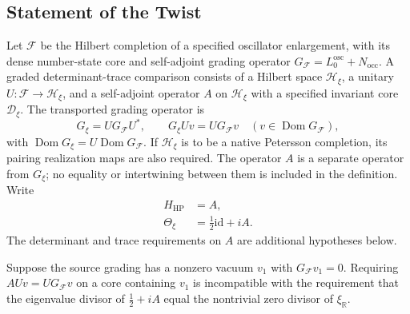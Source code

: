 \subsection{Statement of the Twist}
\label{v4-arith:w5-b:twist:statement}

\begin{definition}
\label{v4-arith:w5-b:def:twist}
Let $\mathcal F$ be the Hilbert completion of a specified
oscillator enlargement, with its dense number-state core and
self-adjoint grading operator
$G_{\mathcal F}=L_0^{\mathrm{osc}}+N_{\mathrm{occ}}$.
A graded determinant-trace comparison consists of a Hilbert
space $\mathcal H_\xi$, a unitary $U:\mathcal F\to\mathcal H_\xi$,
and a self-adjoint operator $A$ on $\mathcal H_\xi$ with a
specified invariant core $\mathcal D_\xi$. The transported
grading operator is
\begin{equation}
 G_\xi=UG_{\mathcal F}U^*,\qquad
 G_\xi Uv=UG_{\mathcal F}v
       \quad(v\in\operatorname{Dom}G_{\mathcal F}),
 \label{v4-arith:w5-b:eq:twist-intertwine}
\end{equation}
with $\operatorname{Dom}G_\xi=U\operatorname{Dom}G_{\mathcal F}$.
If $\mathcal H_\xi$ is to be a native Petersson completion, its
pairing realization maps are also required. The operator $A$
is a separate operator from $G_\xi$; no equality or intertwining
between them is included in the definition. Write
\begin{align}
 H_{\mathrm{HP}}&=A,
 \label{v4-arith:w5-b:eq:H-HP-def}\\
 \Theta_\xi&=\tfrac12\mathrm{id}+iA.
 \label{v4-arith:w5-b:eq:Theta-xi-def}
\end{align}
The determinant and trace requirements on $A$ are additional
hypotheses below.
\end{definition}

\begin{proposition}
\label{v4-arith:w5-b:rem:what-iv-says}
\label{v4-arith:w5-b:vacuum-obstruction}
Suppose the source grading has a nonzero vacuum $v_1$ with
$G_{\mathcal F}v_1=0$. Requiring
$AUv=UG_{\mathcal F}v$ on a core containing $v_1$ is incompatible
with the requirement that the eigenvalue divisor of
$\tfrac12+iA$ equal the nontrivial zero divisor of $\xi_{\mathbb R}$.
\end{proposition}


